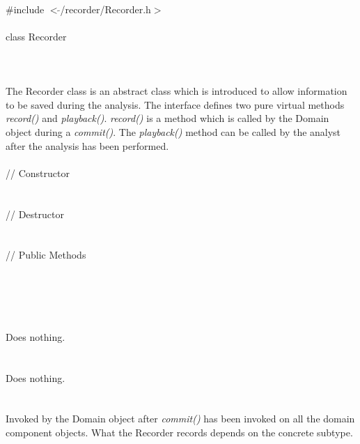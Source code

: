 
   \\
\indent \#include $<\tilde{ }$/recorder/Recorder.h$>$  \\

  \\
\indent class Recorder \\

 \\
 \\

  \\
\indent The Recorder class is an abstract class which is introduced to allow
information to be saved during the analysis. The interface defines two
pure virtual methods {\em record()} and {\em playback()}. {\em
record()} is a method which is called by the Domain object during a
{\em commit()}. The {\em playback()} method can be called by the analyst after
the analysis has been performed. \\

 \\
\indent // Constructor \\
\\ \\
\indent // Destructor \\
\\ \\
\indent // Public Methods  \\
\\
\\
\\ 

  \\
  \\ 
Does nothing.\\

 \\
\\ 
Does nothing. \\

  \\
\\
Invoked by the Domain object after {\em commit()} has been invoked on all the
domain component objects. What the Recorder records depends on the
concrete subtype. \\

